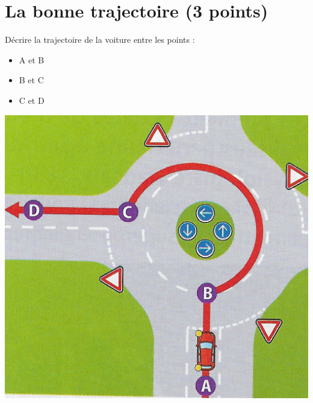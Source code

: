 \section{La bonne trajectoire (3 points)}

\begin{questions}
	\begin{multicols}{2}
		\question[3] Décrire la trajectoire de la voiture entre les points : 
	\begin{itemize}
		\item A et B
		\item B et C
		\item C et D
	\end{itemize}

	\begin{center}
		\includegraphics[scale=1]{rp}
	\end{center}
	\end{multicols}

	\fillwithdottedlines{4cm}
\end{questions}
